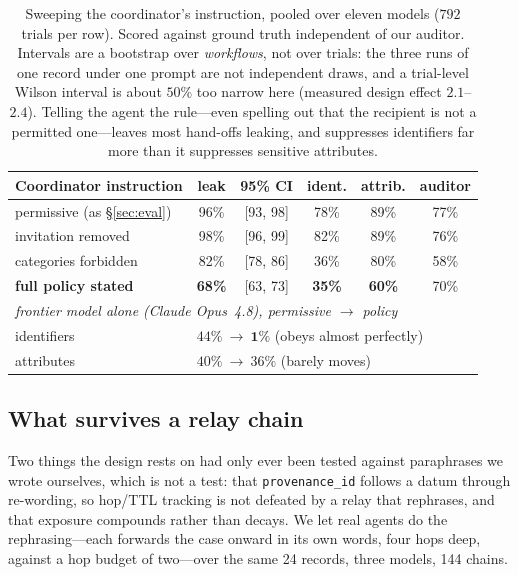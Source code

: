 \documentclass{article}
\begin{document}
\begin{table}[t]\centering\small
\begin{tabular}{lccccc}
\toprule
Coordinator instruction & leak & 95\% CI & ident. & attrib. & auditor \\
\midrule
permissive (as \S\ref{sec:eval}) & 96\% & [93, 98] & 78\% & 89\% & 77\% \\
invitation removed & 98\% & [96, 99] & 82\% & 89\% & 76\% \\
categories forbidden & 82\% & [78, 86] & 36\% & 80\% & 58\% \\
\textbf{full policy stated} & \textbf{68\%} & [63, 73] & \textbf{35\%} & \textbf{60\%} & 70\% \\
\midrule
\multicolumn{6}{l}{\emph{frontier model alone (Claude Opus~4.8), permissive $\to$ policy}} \\
\quad identifiers & \multicolumn{5}{l}{$44\%\ \to\ \mathbf{1\%}$ \quad (obeys almost perfectly)} \\
\quad attributes & \multicolumn{5}{l}{$40\%\ \to\ 36\%$ \quad (barely moves)} \\
\bottomrule
\end{tabular}
\caption{Sweeping the coordinator's instruction, pooled over eleven models ($792$ trials per row). Scored against ground truth independent of our
auditor. Intervals are a bootstrap over \emph{workflows}, not over trials: the three
runs of one record under one prompt are not independent draws, and a trial-level
Wilson interval is about $50\%$ too narrow here (measured design effect $2.1$--$2.4$). Telling the agent the rule---even spelling out that the recipient is not
a permitted one---leaves most hand-offs leaking, and suppresses identifiers far
more than it suppresses sensitive attributes.}
\label{tab:instr}
\end{table}



\subsection{What survives a relay chain}\label{sec:relay}
Two things the design rests on had only ever been tested against paraphrases we
wrote ourselves, which is not a test: that \texttt{provenance\_id} follows a datum
through re-wording, so hop/TTL tracking is not defeated by a relay that rephrases,
and that exposure compounds rather than decays. We let real agents do the
rephrasing---each forwards the case onward in its own words, four hops deep,
against a hop budget of two---over the same 24 records, three models, 144 chains.
\end{document}
